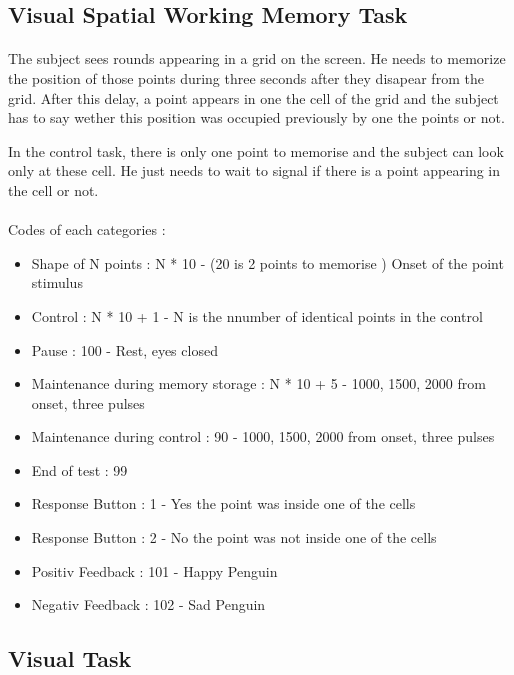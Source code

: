 \documentclass[a4paper]{article}
\begin{document}
\subsection{Visual Spatial Working Memory Task} \label{locamvis}   
\paragraph{} The subject sees rounds appearing in a grid on the screen. He needs to memorize the position of those points during three seconds after they disapear from the grid.  After this delay, a point appears in one the cell of the grid and the subject has to say wether this position was occupied previously by one the points or not.

In the control task, there is only one point to memorise and the subject can look only at these cell. He just needs to wait to signal if there is a point appearing in the cell or not.

\paragraph{}
Codes of each categories :

\begin{itemize}
\item Shape of N points : N * 10 - (20 is 2 points to memorise ) Onset of the point stimulus 
\item Control : N * 10 + 1 - N is the nnumber of identical points in the control
\item Pause : 100 - Rest, eyes closed
\item Maintenance during memory storage : N * 10 + 5 - 1000, 1500, 2000 from onset,  three pulses
\item Maintenance during control  : 90 - 1000, 1500, 2000 from onset,  three pulses
\item End of test : 99
\item Response Button : 1 - Yes the point was inside one of the cells
\item Response Button : 2 - No the point was not inside one of the cells
\item Positiv Feedback : 101 - Happy Penguin
\item Negativ Feedback : 102 - Sad Penguin 
\end{itemize}

\subsection{Visual Task} \label{locavisu}   
\end{document}

